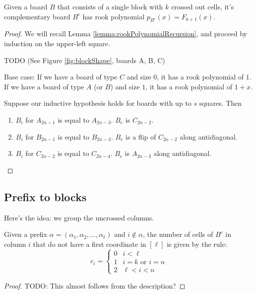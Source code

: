 \begin{lemma}
  Given a board $B$ that consists of a single block with $k$ crossed out cells,
  it's complementary board $B^c$ has rook polynomial $p_{B^c}(x) = F_{k + 1}(x)$.
\end{lemma}
\begin{proof}
  We will recall Lemma \ref{lemma:rookPolynomialRecursion}, and proceed by
  induction on the upper-left square.

  TODO (See Figure \ref{fig:blockShape}, boards A, B, C)

  Base case:
  If we have a board of type $C$ and size $0$, it has a rook polynomial of $1$.
  If we have a board of type $A$ (or $B$) and size $1$, it has a rook polynomial of $1 + x$.

  Suppose our inductive hypothesis holds for boards with up to $s$ squares. Then
  \begin{enumerate}
    \item $B_i$ for $A_{2n-1}$ is equal to $A_{2n-3}$. $B_e$ is $C_{2n-2}$.
    \item $B_i$ for $B_{2n-1}$ is equal to $B_{2n-3}$. $B_e$ is a flip of $C_{2n-2}$ along antidiagonal.
    \item $B_i$ for $C_{2n-2}$ is equal to $C_{2n-4}$. $B_e$ is $A_{2n-3}$ along antidiagonal.
  \end{enumerate}
\end{proof}

\subsection{Prefix to blocks}
Here's the idea: we group the uncrossed columns.

\begin{lemma}
  Given a prefix $\alpha = (\alpha_1, \alpha_2, \dots, \alpha_\ell)$
  and $i \not\in \alpha$,
  the number of cells of $B^c$ in column $i$ that do not have
  a first coordinate in $[\ell]$
  is given by the rule:
  \begin{equation}
    c_i = \begin{cases}
      0 & i < \ell \\
      1 & i = k \text{ or } i = n \\
      2 & \ell < i < n
    \end{cases}
  \end{equation}
\end{lemma}

\begin{proof}
  TODO: This almost follows from the description?
\end{proof}

